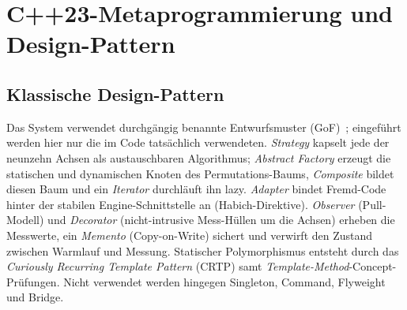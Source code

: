 \section{C++23-Metaprogrammierung und Design-Pattern}\label{sec:cpp23}
\subsection{Klassische Design-Pattern}\label{ssec:classic-patterns}
Das System verwendet durchgängig benannte Entwurfsmuster (GoF)~\cite{gamma1994patterns}; eingeführt
werden hier nur die im Code tatsächlich verwendeten\@. \emph{Strategy} kapselt jede der neunzehn
Achsen als austauschbaren Algorithmus; \emph{Abstract Factory} erzeugt die statischen und
dynamischen Knoten des Permutations-Baums, \emph{Composite} bildet diesen Baum und ein
\emph{Iterator} durchläuft ihn lazy\@. \emph{Adapter} bindet Fremd-Code hinter der stabilen
Engine-Schnittstelle an (Habich-Direktive)\@. \emph{Observer} (Pull-Modell) und \emph{Decorator}
(nicht-intrusive Mess-Hüllen um die Achsen) erheben die Messwerte, ein \emph{Memento}
(Copy-on-Write) sichert und verwirft den Zustand zwischen Warmlauf und Messung. Statischer
Polymorphismus entsteht durch das \emph{Curiously Recurring Template Pattern} (CRTP) samt
\emph{Template-Method}-Concept-Prüfungen. Nicht verwendet werden hingegen Singleton, Command,
Flyweight und Bridge.

